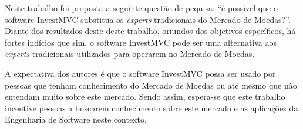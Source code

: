Neste trabalho foi proposta a seguinte questão de pequisa: “é possível que o software InvestMVC substitua os \textit{experts} tradicionais do Mercado de Moedas?”. Diante dos resultados deste deste trabalho, oriundos dos objetivos específicos, há fortes indícios que sim, o software InvestMVC pode ser uma alternativa aos \textit{experts} tradicionais utilizados para operarem no Mercado de Moedas.


A expectativa dos autores é que o software InvestMVC possa ser usado por pessoas que tenham conhecimento do Mercado de Moedas ou até mesmo que não entendam muito sobre este mercado. Sendo assim, espera-se que este trabalho incentive pessoas a buscarem conhecimento sobre este mercado e as aplicações da Engenharia de Software neste contexto.
